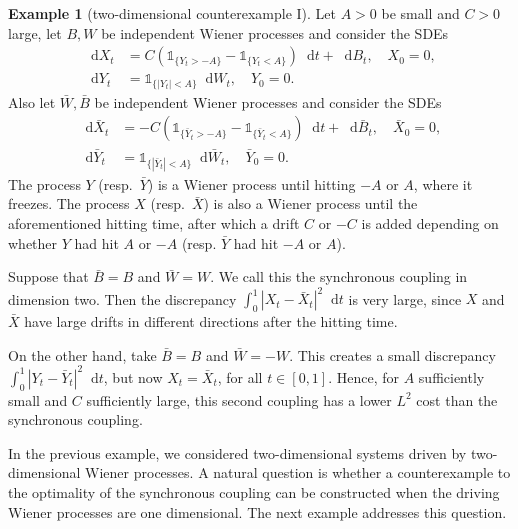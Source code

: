 \documentclass[oneside]{amsart}
\theoremstyle{definition}
\newtheorem{example}[theorem]{Example}
\newcommand{\D}{\mathop{}\!\mathrm{d}}
\numberwithin{equation}{section}
\begin{document}
		\begin{example}[two-dimensional counterexample I]\label{ex:2d-1}
			Let $A > 0$ be small and $C > 0$ large, let $B, W$ be independent Wiener processes and consider the SDEs
			\begin{equation}
				\begin{split}
					\D X_t & = C \!\left(\mathds{1}_{\{Y_t > - A\}} - \mathds{1}_{\{Y_t < A\}}\right)\D t + \D B_t, \quad X_0 = 0,\\
					\D Y_t & = \mathds{1}_{\{|Y_t|< A\}}\D W_t, \quad Y_0 = 0.
				\end{split}
			\end{equation}
			Also let $\bar W, \bar B$ be independent Wiener processes and consider the SDEs
			\begin{equation}
				\begin{split}
					\D \bar X_t & = - C \!\left(\mathds{1}_{\{\bar Y_t > - A\}} - \mathds{1}_{\{ \bar Y_t < A\}}\right)\D t + \D \bar B_t, \quad \bar X_0 = 0,\\
					\D \bar Y_t & = \mathds{1}_{\{|\bar Y_t|< A\}}\D \bar W_t, \quad \bar Y_0 = 0.
				\end{split}
			\end{equation}
			The process $Y$ (resp.\ $\bar Y$) is a Wiener process until hitting $-A$ or $A$, where it freezes. The process $X$ (resp.\ $\bar X$) is also a Wiener process until the aforementioned hitting time, after which a drift $C$ or $-C$ is added depending on whether $Y$ had hit $A$ or $-A$ (resp. $\bar Y$ had hit $-A$ or $A$).
			
			Suppose that $\bar B = B$ and $\bar W = W$. We call this the synchronous coupling in dimension two. Then the discrepancy $\int_0^1|X_t - \bar X_t|^2\D t$ is very large, since $X$ and $\bar X$ have large drifts in different directions after the hitting time.
			
			On the other hand, take $\bar B = B$ and $\bar W = - W$. This creates a small discrepancy $\int_0^1 |Y_t - \bar Y_t|^2 \D t$, but now $X_t = \bar X_t$, for all $t \in [0, 1]$. Hence, for $A$ sufficiently small and $C$ sufficiently large, this second coupling has a lower $L^2$ cost than the synchronous coupling.
		\end{example}

		In the previous example, we considered two-dimensional systems driven by two-dimensional Wiener processes. A natural question is whether a counterexample to the optimality of the synchronous coupling can be constructed when the driving Wiener processes are one dimensional. The next example addresses this question.
\end{document}
